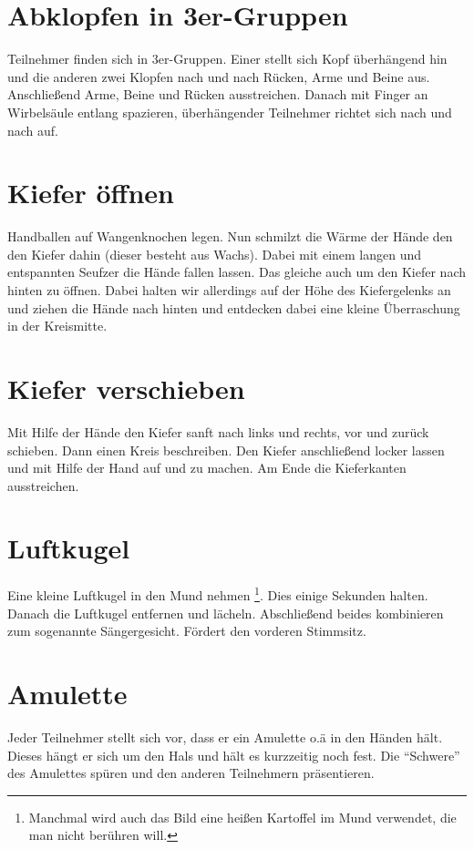 \documentclass[ngerman, a4paper, twoside]{scrbook}%
\begin{document}
	\section{Abklopfen in 3er-Gruppen}
	Teilnehmer finden sich in 3er-Gruppen. Einer stellt sich Kopf überhängend hin und die anderen zwei Klopfen nach und nach Rücken, Arme und Beine aus. Anschließend Arme, Beine und Rücken ausstreichen. Danach mit Finger an Wirbelsäule entlang spazieren, überhängender Teilnehmer richtet sich nach und nach auf.

	\section{Kiefer öffnen}
	Handballen auf Wangenknochen legen. Nun schmilzt die Wärme der Hände den den Kiefer dahin (dieser besteht aus Wachs). Dabei mit einem langen und entspannten Seufzer die Hände fallen lassen. Das gleiche auch um den Kiefer nach hinten zu öffnen. Dabei halten wir allerdings auf der Höhe des Kiefergelenks an und ziehen die Hände nach hinten und entdecken dabei eine kleine Überraschung in der Kreismitte.

	 \section{Kiefer verschieben}
	 Mit Hilfe der Hände den Kiefer sanft nach links und rechts, vor und zurück schieben. Dann einen Kreis beschreiben. Den Kiefer anschließend locker lassen und mit Hilfe der Hand auf und zu machen.  Am Ende die Kieferkanten ausstreichen.

	 \section{Luftkugel}
	 Eine kleine Luftkugel in den Mund nehmen \footnote{Manchmal wird auch das Bild eine heißen Kartoffel im Mund verwendet, die man nicht berühren will.}. Dies einige Sekunden halten. Danach die Luftkugel entfernen und lächeln. Abschließend beides kombinieren zum sogenannte Sängergesicht. Fördert den vorderen Stimmsitz.

	 \section{Amulette}
	 Jeder Teilnehmer stellt sich vor, dass er ein Amulette o.ä in den Händen hält. Dieses hängt er sich um den Hals und hält es kurzzeitig noch fest. Die "`Schwere"' des Amulettes spüren und den anderen Teilnehmern präsentieren.
\end{document}

